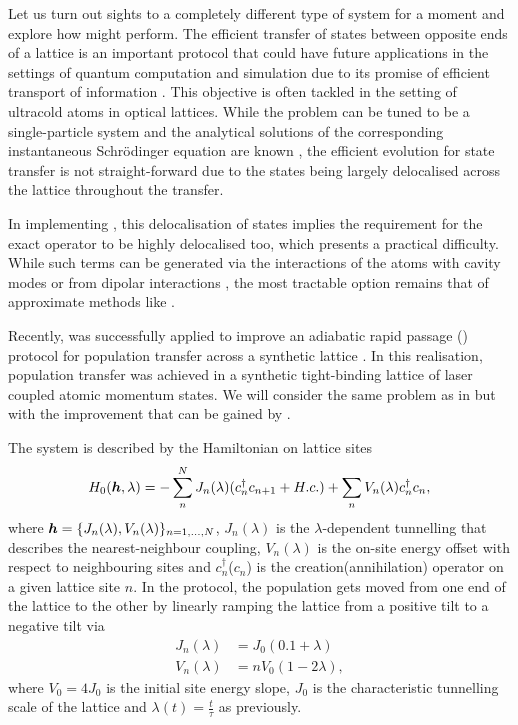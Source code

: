 Let us turn out sights to a completely different type of system for a moment and explore how  might perform. The efficient transfer of states between opposite ends of a lattice is an important protocol that could have future applications in the settings of quantum computation and simulation due to its promise of efficient transport of information \cite{lang_topological_2017}. This objective is often tackled in the setting of ultracold atoms in optical lattices. While the problem can be tuned to be a single-particle system and the analytical solutions of the corresponding instantaneous Schr\"odinger equation are known \cite{hatsugai_chern_1993,hugel_chiral_2014}, the efficient evolution for state transfer is not straight-forward due to the states being largely delocalised across the lattice throughout the transfer. 

In implementing , this delocalisation of states implies the requirement for the exact  operator to be highly delocalised too, which presents a practical difficulty. While such terms can be generated via the interactions of the atoms with cavity modes \cite{landig_quantum_2016,keller_phases_2017} or from dipolar interactions \cite{baranov_ultracold_2002, trefzger_ultracold_2011}, the most tractable option remains that of approximate methods like .

Recently,  was successfully applied to improve an adiabatic rapid passage () protocol for population transfer across a synthetic lattice \cite{meier_counterdiabatic_2020}. In this realisation, population transfer was achieved in a synthetic tight-binding lattice of laser coupled atomic momentum states. We will consider the same problem as in \cite{meier_counterdiabatic_2020} but with the improvement that can be gained by . 

The system is described by the Hamiltonian on  lattice sites
\begin{equation}\label{eq:lattice_hamiltonian}
    H_0(\boldsymbol{h}, \lambda) = - \sum_n^N J_n(\lambda)(c_n^{\dag}c_{n+1} + H.c.) + \sum_n V_n(\lambda) c_n^{\dag}c_n,
\end{equation}
where $\boldsymbol{h} = \{ J_n(\lambda), V_n(\lambda)\}_{n = 1, ..., N}$, $J_n(\lambda)$ is the $\lambda$-dependent tunnelling that describes the nearest-neighbour coupling, $V_n(\lambda)$ is the on-site energy offset with respect to neighbouring sites and $c_n^{\dag}$($c_{n}$) is the creation(annihilation) operator on a given lattice site $n$. In the  protocol, the population gets moved from one end of the lattice to the other by linearly ramping the lattice from a positive tilt to a negative tilt via
\begin{equation} \label{eq:J_lattice}
    \begin{aligned}
        J_n(\lambda) &= J_0(0.1 + \lambda) \\
        V_n(\lambda) &= n V_0 (1 - 2\lambda),
    \end{aligned}
\end{equation}
where $V_0 = 4J_0$ is the initial site energy slope, $J_0$ is the characteristic tunnelling scale of the lattice and $\lambda(t) = \frac{t}{\tau}$ as previously.

